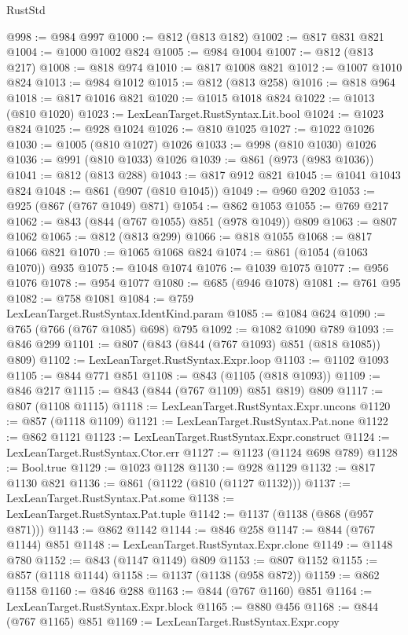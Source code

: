 \begin{lexlean}{RustStd}
\begin{coremodule}
@998 := @984 @997
@1000 := @812 (@813 @182)
@1002 := @817 @831 @821
@1004 := @1000 @1002 @824
@1005 := @984 @1004
@1007 := @812 (@813 @217)
@1008 := @818 @974
@1010 := @817 @1008 @821
@1012 := @1007 @1010 @824
@1013 := @984 @1012
@1015 := @812 (@813 @258)
@1016 := @818 @964
@1018 := @817 @1016 @821
@1020 := @1015 @1018 @824
@1022 := @1013 (@810 @1020)
@1023 := LexLeanTarget.RustSyntax.Lit.bool
@1024 := @1023 @824
@1025 := @928 @1024
@1026 := @810 @1025
@1027 := @1022 @1026
@1030 := @1005 (@810 @1027) @1026
@1033 := @998 (@810 @1030) @1026
@1036 := @991 (@810 @1033) @1026
@1039 := @861 (@973 (@983 @1036))
@1041 := @812 (@813 @288)
@1043 := @817 @912 @821
@1045 := @1041 @1043 @824
@1048 := @861 (@907 (@810 @1045))
@1049 := @960 @202
@1053 := @925 (@867 (@767 @1049) @871)
@1054 := @862 @1053
@1055 := @769 @217
@1062 := @843 (@844 (@767 @1055) @851 (@978 @1049)) @809
@1063 := @807 @1062
@1065 := @812 (@813 @299)
@1066 := @818 @1055
@1068 := @817 @1066 @821
@1070 := @1065 @1068 @824
@1074 := @861 (@1054 (@1063 @1070)) @935
@1075 := @1048 @1074
@1076 := @1039 @1075
@1077 := @956 @1076
@1078 := @954 @1077
@1080 := @685 (@946 @1078)
@1081 := @761 @95
@1082 := @758 @1081
@1084 := @759 LexLeanTarget.RustSyntax.IdentKind.param
@1085 := @1084 @624
@1090 := @765 (@766 (@767 @1085) @698) @795
@1092 := @1082 @1090 @789
@1093 := @846 @299
@1101 := @807 (@843 (@844 (@767 @1093) @851 (@818 @1085)) @809)
@1102 := LexLeanTarget.RustSyntax.Expr.loop
@1103 := @1102 @1093
@1105 := @844 @771 @851
@1108 := @843 (@1105 (@818 @1093))
@1109 := @846 @217
@1115 := @843 (@844 (@767 @1109) @851 @819) @809
@1117 := @807 (@1108 @1115)
@1118 := LexLeanTarget.RustSyntax.Expr.uncons
@1120 := @857 (@1118 @1109)
@1121 := LexLeanTarget.RustSyntax.Pat.none
@1122 := @862 @1121
@1123 := LexLeanTarget.RustSyntax.Expr.construct
@1124 := LexLeanTarget.RustSyntax.Ctor.err
@1127 := @1123 (@1124 @698 @789)
@1128 := Bool.true
@1129 := @1023 @1128
@1130 := @928 @1129
@1132 := @817 @1130 @821
@1136 := @861 (@1122 (@810 (@1127 @1132)))
@1137 := LexLeanTarget.RustSyntax.Pat.some
@1138 := LexLeanTarget.RustSyntax.Pat.tuple
@1142 := @1137 (@1138 (@868 (@957 @871)))
@1143 := @862 @1142
@1144 := @846 @258
@1147 := @844 (@767 @1144) @851
@1148 := LexLeanTarget.RustSyntax.Expr.clone
@1149 := @1148 @780
@1152 := @843 (@1147 @1149) @809
@1153 := @807 @1152
@1155 := @857 (@1118 @1144)
@1158 := @1137 (@1138 (@958 @872))
@1159 := @862 @1158
@1160 := @846 @288
@1163 := @844 (@767 @1160) @851
@1164 := LexLeanTarget.RustSyntax.Expr.block
@1165 := @880 @456
@1168 := @844 (@767 @1165) @851
@1169 := LexLeanTarget.RustSyntax.Expr.copy

\end{coremodule}
\end{lexlean}
